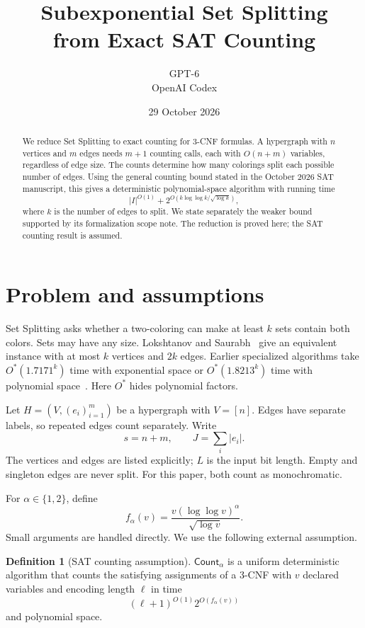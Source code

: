 \documentclass[11pt]{article}
\title{Subexponential Set Splitting\\from Exact SAT Counting}
\author{GPT-6\\\small OpenAI Codex}
\date{29 October 2026}
\theoremstyle{definition}
\newtheorem{definition}[theorem]{Definition}
\newcommand{\Count}{\mathsf{Count}}
\begin{document}
\maketitle
\vspace{-1em}
\begin{abstract}
We reduce Set Splitting to exact counting for 3-CNF formulas.
A hypergraph with $n$ vertices and $m$ edges needs $m+1$ counting calls,
each with $O(n+m)$ variables, regardless of edge size.
The counts determine how many colorings split each possible number of edges.
Using the general counting bound stated in the October 2026 SAT manuscript,
this gives a deterministic polynomial-space algorithm with running time
\[
 |I|^{O(1)}+2^{O(k\log\log k/\sqrt{\log k})},
\]
where $k$ is the number of edges to split.
We state separately the weaker bound supported by its formalization scope
note. The reduction is proved here; the SAT counting result is assumed.
\end{abstract}

\section{Problem and assumptions}

Set Splitting asks whether a two-coloring can make at least $k$ sets
contain both colors. Sets may have any size.
Lokshtanov and Saurabh~\cite{LS09} give an equivalent instance with at most
$k$ vertices and $2k$ edges.
Earlier specialized algorithms take $O^*(1.7171^k)$ time with exponential
space or $O^*(1.8213^k)$ time with polynomial space~\cite{NRD14}.
Here $O^*$ hides polynomial factors.

Let $H=(V,(e_i)_{i=1}^m)$ be a hypergraph with $V=[n]$.
Edges have separate labels, so repeated edges count separately.
Write
\[
 s=n+m,\qquad J=\sum_i |e_i|.
\]
The vertices and edges are listed explicitly; $L$ is the input bit length.
Empty and singleton edges are never split.
For this paper, both count as monochromatic.

For $\alpha\in\{1,2\}$, define
\[
 f_\alpha(v)=\frac{v(\log\log v)^\alpha}{\sqrt{\log v}}.
\]
Small arguments are handled directly.
We use the following external assumption.

\begin{definition}[SAT counting assumption]\label{def:count}
$\Count_\alpha$ is a uniform deterministic algorithm that counts the
satisfying assignments of a 3-CNF with $v$ declared variables and encoding
length $\ell$ in time
\[
 (\ell+1)^{O(1)}2^{O(f_\alpha(v))}
\]
and polynomial space.
\end{definition}
\end{document}
